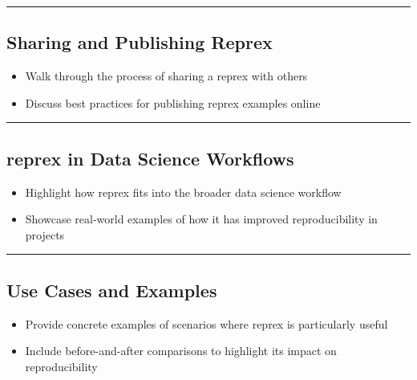 \documentclass[
  letterpaper,
  DIV=11,
  numbers=noendperiod]{scrartcl}
\providecommand{\tightlist}{%
  \setlength{\itemsep}{0pt}\setlength{\parskip}{0pt}}\usepackage{longtable,booktabs,array}
\begin{document}
\begin{center}\rule{0.5\linewidth}{0.5pt}\end{center}

\hypertarget{sharing-and-publishing-reprex}{%
\subsection{Sharing and Publishing
Reprex}\label{sharing-and-publishing-reprex}}

\begin{itemize}
\tightlist
\item
  Walk through the process of sharing a reprex with others
\item
  Discuss best practices for publishing reprex examples online
\end{itemize}

\begin{center}\rule{0.5\linewidth}{0.5pt}\end{center}

\hypertarget{reprex-in-data-science-workflows}{%
\subsection{reprex in Data Science
Workflows}\label{reprex-in-data-science-workflows}}

\begin{itemize}
\tightlist
\item
  Highlight how reprex fits into the broader data science workflow
\item
  Showcase real-world examples of how it has improved reproducibility in
  projects
\end{itemize}

\begin{center}\rule{0.5\linewidth}{0.5pt}\end{center}

\hypertarget{use-cases-and-examples}{%
\subsection{Use Cases and Examples}\label{use-cases-and-examples}}

\begin{itemize}
\tightlist
\item
  Provide concrete examples of scenarios where reprex is particularly
  useful
\item
  Include before-and-after comparisons to highlight its impact on
  reproducibility
\end{itemize}
\end{document}

